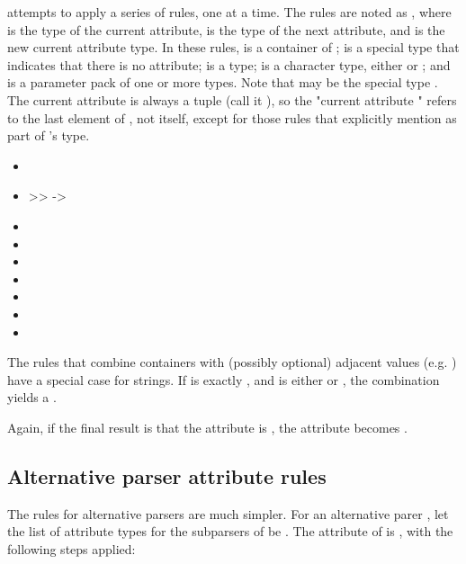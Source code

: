 \documentclass{MyBook}
\begin{document}
 attempts to apply a series of rules, one at a time. The rules are noted as , where  is the type of the current attribute,  is the type of the next attribute, and  is the new current attribute type. In these rules,  is a container of ;  is a special type that indicates that there is no attribute;  is a type;  is a character type, either  or ; and  is a parameter pack of one or more types. Note that  may be the special type . The current attribute is always a tuple (call it ), so the "current attribute " refers to the last element of , not  itself, except for those rules that explicitly mention  as part of 's type.

\begin{itemize}
\item
\item
   \textgreater>  -> 
\item
\item
\item
\item
\item
\item
\item
\end{itemize}

The rules that combine containers with (possibly optional) adjacent values (e.g. ) have a special case for strings. If  is exactly , and  is either  or , the combination yields a .

Again, if the final result is that the attribute is , the attribute becomes .



\subsection{Alternative parser attribute rules}

The rules for alternative parsers are much simpler. For an alternative parer , let the list of attribute types for the subparsers of  be . The attribute of  is , with the following steps applied:
\end{document}
